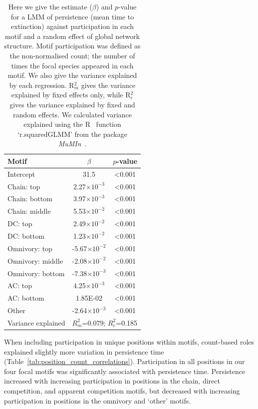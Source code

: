 \documentclass[12pt]{article}
\begin{document}
\begin{spacing}{2.0}
		\begin{table}[h!]
    		\caption{Here we give the estimate ($\beta$) and $p$-value for a LMM of persistence (mean time to extinction) against participation in each motif and a random effect of global network structure. Motif participation was defined as the non-normalised count; the number of times the focal species appeared in each motif. We also give the variance explained by each regression. R$^{2}_{m}$ gives the variance explained by fixed effects only, while R$^{2}_{c}$ gives the variance explained by fixed and random effects. We calculated variance explained using the R~\citep{R} function `r.squaredGLMM' from the package \emph{MuMIn}~\citep{MuMIn}.}
    		\label{tab:count_positions}
    		\begin{tabular}{l | c c}
    		Motif & $\beta$ & $p$-value \\  
    		\hline
            Intercept	&	31.5	&	\textless0.001	\\
            Chain: top	&	2.27$\times10^{-3}$	&	\textless0.001	\\
            Chain: bottom	&	3.97$\times10^{-3}$	&	\textless0.001	\\
            Chain: middle	&	5.53$\times10^{-2}$	&	\textless0.001	\\
            DC: top	&	2.49$\times10^{-2}$	&	\textless0.001	\\
            DC: bottom	&	1.23$\times10^{-2}$	&	\textless0.001	\\
            Omnivory: top	&	-5.67$\times10^{-2}$	&	\textless0.001	\\
            Omnivory: middle	&	-2.08$\times10^{-2}$	&	\textless0.001	\\
            Omnivory: bottom	&	-7.38$\times10^{-3}$	&	\textless0.001	\\
            AC: top	&	4.25$\times10^{-3}$	&	\textless0.001	\\
            AC: bottom	&	1.85E-02	&	\textless0.001	\\
            Other	&	-2.64$\times10^{-3}$	&	\textless0.001	\\
            \hline
    		Variance explained & \multicolumn{2}{c}{$R^{2}_m$=0.079; $R^2_c$=0.185} \\
    		\hline
    		\end{tabular}
    		\end{table}

        
        When including participation in unique positions within motifs, count-based roles explained slightly more variation in persistence time (Table~\ref{tab:position_count_correlations}).
        Participation in all positions in our four focal motifs was significantly associated with persistence time.
        Persistence increased with increasing participation in positions in the chain, direct competition, and apparent competition motifs, but decreased with increasing participation in positions in the omnivory and `other' motifs.



\end{spacing}
\end{document}
